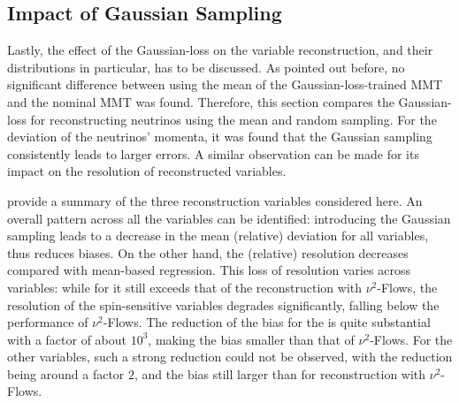 \subsection{Impact of Gaussian Sampling}
Lastly, the effect of the Gaussian-loss on the variable reconstruction, and their distributions in particular, has to be discussed. As pointed out before, no significant difference between using the mean of the Gaussian-loss-trained MMT and the nominal MMT was found. Therefore, this section compares the Gaussian-loss for reconstructing neutrinos using the mean and random sampling. For the deviation of the neutrinos' momenta, it was found that the Gaussian sampling consistently leads to larger errors. A similar observation can be made for its impact on the resolution of reconstructed variables.
\begin{table}[ht]
    \centering
    \caption{Summary of mean relative deviation and relative resolution for the reconstructed mass of the \ttbar system for the MMT trained with the Gaussian-loss with Mean and Gaussian sampling.}
    
    \label{tab:gaussian_loss:ttbar_mass_reso}
    \caption{Summary of \chel-reconstruction performance}
    
    \label{tab:gaussian_loss:c_hel_reso}
    \caption{Summary of \chan-reconstruction performance}
    
    \label{tab:gaussian_loss:c_han_reso}
\end{table}

 provide a summary of the three reconstruction variables considered here. An overall pattern across all the variables can be identified: introducing the Gaussian sampling leads to a decrease in the mean (relative) deviation for all variables, thus reduces biases. On the other hand, the (relative) resolution decreases compared with mean-based regression. This loss of resolution varies across variables: while for \mttbar it still exceeds that of the reconstruction with $\nu^2$-Flows, the resolution of the spin-sensitive variables degrades significantly, falling below the performance of $\nu^2$-Flows. The reduction of the bias for the \mttbar is quite substantial with a factor of about $10^{3}$, making the bias smaller than that of $\nu^2$-Flows. For the other variables, such a strong reduction could not be observed, with the reduction being around a factor $2$, and the bias still larger than for reconstruction with $\nu^2$-Flows.

